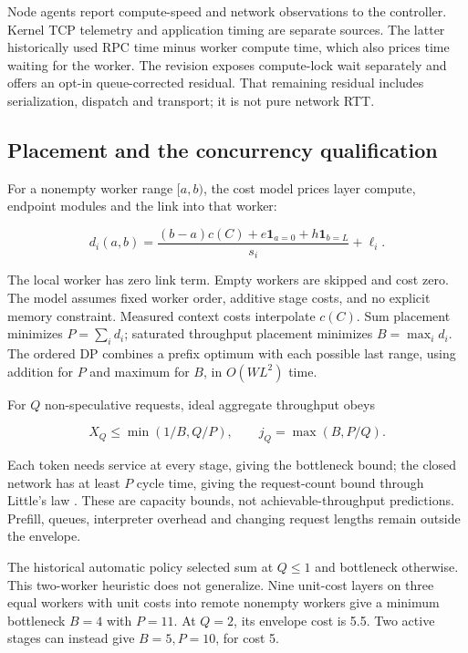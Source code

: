 \documentclass[conference]{IEEEtran}
\begin{document}
Node agents report compute-speed and network observations to the
controller. Kernel TCP telemetry and application timing are separate
sources. The latter historically used RPC time minus worker compute
time, which also prices time waiting for the worker. The revision
exposes compute-lock wait separately and offers an opt-in
queue-corrected residual. That remaining residual includes
serialization, dispatch and transport; it is not pure network RTT.

\hypertarget{placement-and-the-concurrency-qualification}{%
\subsection{Placement and the concurrency
qualification}\label{placement-and-the-concurrency-qualification}}

For a nonempty worker range \([a,b)\), the cost model prices layer
compute, endpoint modules and the link into that worker:

\[d_i(a,b)=\frac{(b-a)c(C)+e\mathbf{1}_{a=0}+h\mathbf{1}_{b=L}}{s_i}
 +\ell_i. \tag{1}\]

The local worker has zero link term. Empty workers are skipped and cost
zero. The model assumes fixed worker order, additive stage costs, and no
explicit memory constraint. Measured context costs interpolate \(c(C)\).
Sum placement minimizes \(P=\sum_i d_i\); saturated throughput placement
minimizes \(B=\max_i d_i\). The ordered DP combines a prefix optimum
with each possible last range, using addition for \(P\) and maximum for
\(B\), in \(O(WL^2)\) time.

For \(Q\) non-speculative requests, ideal aggregate throughput obeys

\[X_Q\le\min(1/B,Q/P),\qquad j_Q=\max(B,P/Q). \tag{2}\]

Each token needs service at every stage, giving the bottleneck bound;
the closed network has at least \(P\) cycle time, giving the
request-count bound through Little's law
\citep{little1961proof, reiser1980mva}. These are capacity bounds, not
achievable-throughput predictions. Prefill, queues, interpreter overhead
and changing request lengths remain outside the envelope.

The historical automatic policy selected sum at \(Q\le1\) and bottleneck
otherwise. This two-worker heuristic does not generalize. Nine unit-cost
layers on three equal workers with unit costs into remote nonempty
workers give a minimum bottleneck \(B=4\) with \(P=11\). At \(Q=2\), its
envelope cost is 5.5. Two active stages can instead give \(B=5,P=10\),
for cost 5.
\end{document}
